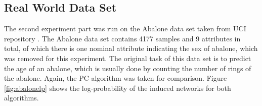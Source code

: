 \documentclass{article}
\begin{document}
\subsection{Real World Data Set}
\label{sec:ExpRealWorld}
% 
The second experiment part was run on the Abalone 
data set \cite{abaloneBook} taken from UCI repository \cite{uciRepo}. The Abalone data set contains 
4177 samples and 9 attributes in total, of which there is one nominal attribute indicating the sex of abalone, which was removed for this experiment. The original task of this data set is to predict the age of an abalone, which is usually done by counting the number of rings of the abalone. Again, the PC algorithm was taken for comparison. 
Figure \ref{fig:abalonelp} shows the log-probability of the induced networks for both algorithms. 
\end{document}

